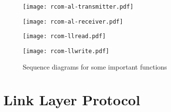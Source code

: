 \documentclass[main.tex]{subfiles}
\begin{document}
\begin{figure}[ph]
\caption{Sequence diagrams for some important functions\label{fig:seqdiagrams}}
	
\begin{minipage}{0.5\textwidth}
\centering
\texttt{[image: rcom-al-transmitter.pdf]}
\end{minipage}
\begin{minipage}{0.5\textwidth}
\centering
\texttt{[image: rcom-al-receiver.pdf]}
\end{minipage}
\begin{minipage}{0.5\textwidth}
\centering
\texttt{[image: rcom-llread.pdf]}
\end{minipage}
\begin{minipage}{0.5\textwidth}
\centering
\texttt{[image: rcom-llwrite.pdf]}
\end{minipage}
\end{figure}

\section{Link Layer Protocol}
\label{sec:llprotocol}
\end{document}
